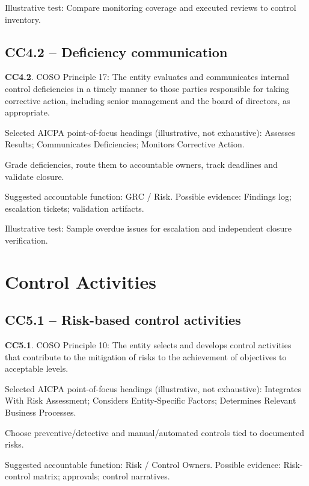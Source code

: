 \documentclass[10pt,oneside]{report}
\begin{document}
Illustrative test: Compare monitoring coverage and executed reviews to control inventory.

\subsection*{CC4.2 -- Deficiency communication}
\begin{aicpabox}
\textbf{CC4.2}. COSO Principle 17: The entity evaluates and communicates internal control deficiencies in a timely manner to those parties responsible for taking corrective action, including senior management and the board of directors, as appropriate.\par{}
\end{aicpabox}
Selected AICPA point-of-focus headings (illustrative, not exhaustive): Assesses Results; Communicates Deficiencies; Monitors Corrective Action.

\begin{engineeringbox}
Grade deficiencies, route them to accountable owners, track deadlines and validate closure.
\end{engineeringbox}
Suggested accountable function: GRC / Risk. Possible evidence: Findings log; escalation tickets; validation artifacts.

Illustrative test: Sample overdue issues for escalation and independent closure verification.

\section{Control Activities}
\subsection*{CC5.1 -- Risk-based control activities}
\begin{aicpabox}
\textbf{CC5.1}. COSO Principle 10: The entity selects and develops control activities that contribute to the mitigation of risks to the achievement of objectives to acceptable levels.\par{}
\end{aicpabox}
Selected AICPA point-of-focus headings (illustrative, not exhaustive): Integrates With Risk Assessment; Considers Entity-Specific Factors; Determines Relevant Business Processes.

\begin{engineeringbox}
Choose preventive/detective and manual/automated controls tied to documented risks.
\end{engineeringbox}
Suggested accountable function: Risk / Control Owners. Possible evidence: Risk-control matrix; approvals; control narratives.
\end{document}
